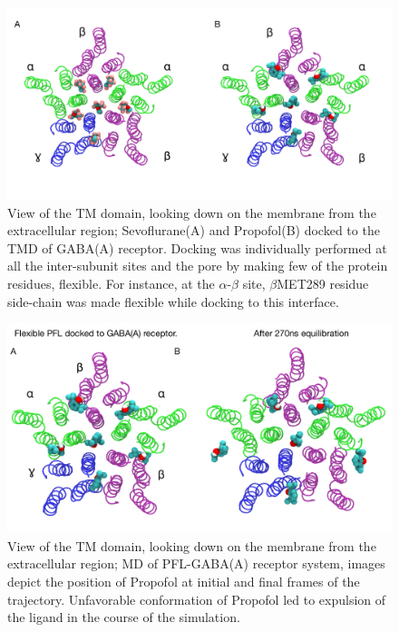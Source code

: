 \documentclass[12pt]{article}
\begin{document}
\begin{figure}
\begin{center}
\centering
\includegraphics[width = 1\textwidth]{finlpics/Figure_2}
\caption{View of the TM domain, looking down on the membrane from the extracellular region; Sevoflurane(A) and Propofol(B) docked to the TMD of GABA(A) receptor. Docking was individually performed at all the inter-subunit sites and the pore by making few of the protein residues, flexible. For instance, at the $\alpha$-$\beta$ site, $\beta$MET289 residue side-chain was made flexible  while docking to this interface.}
\label{fig:dockPic}
\end{center}
\end{figure}


\begin{figure}
\begin{center}
\centering
\includegraphics[width = 1\textwidth]{finlpics/Figure_3}
\caption{View of the TM domain, looking down on the membrane from the extracellular region;   MD  of  PFL-GABA(A)  receptor  system, images depict the position of Propofol at initial and final frames of the trajectory.  Unfavorable conformation of Propofol led to expulsion of the ligand in the course of the simulation.}
\label{fig:PFLequl}
\end{center}
\end{figure}
\end{document}
